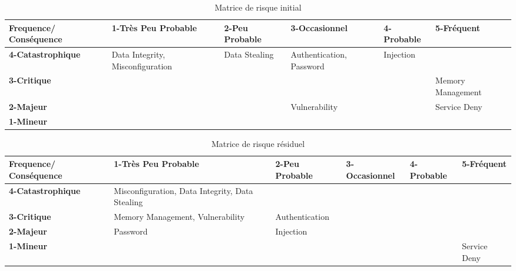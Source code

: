 \documentclass[12pt]{article}
\begin{document}

\begin{table}[H]
\centering
\scriptsize
\begin{tabular}{|p{2cm}|p{2cm}|p{2cm}| p{2cm} |p{2cm}| p{2cm}|}
\hline \bf Frequence/ Conséquence & \bf 1-Très Peu Probable & \bf 2-Peu Probable & \bf 3-Occasionnel & \bf 4-Probable & \bf 5-Fréquent\\ [10pt]
\hline \bf 4-Catastrophique &Data Integrity, Misconfiguration\cellcolor{yellow!50} & Data Stealing\cellcolor{red!50} & Authentication, Password\cellcolor{red!50} & Injection\cellcolor{red!50} &\cellcolor{red!50} \\ [10pt]
\hline \bf 3-Critique &\cellcolor{green!50} & \cellcolor{yellow!50} & \cellcolor{yellow!50} & \cellcolor{red!50} & Memory Management\cellcolor{red!50} \\ [10pt]
\hline \bf 2-Majeur & \cellcolor{green!50} & \cellcolor{green!50} & Vulnerability\cellcolor{yellow!50} &\cellcolor{yellow!50} &Service Deny\cellcolor{red!50} \\ [10pt]
\hline \bf 1-Mineur & \cellcolor{green!50} & \cellcolor{green!50} & \cellcolor{green!50} &\cellcolor{yellow!50} &\cellcolor{yellow!50} \\ [10pt]
\hline
\end{tabular}
\caption{Matrice de risque initial}

\end{table}

 

\begin{table}[H]
\centering
\scriptsize
\begin{tabular}{|p{2cm}|p{2cm}|p{2cm}| p{2cm} |p{2cm}| p{2cm}|}
\hline \bf Frequence/ Conséquence & \bf 1-Très Peu Probable & \bf 2-Peu Probable & \bf 3-Occasionnel & \bf 4-Probable & \bf 5-Fréquent\\ [10pt]
\hline \bf 4-Catastrophique & Misconfiguration, Data Integrity, Data Stealing \cellcolor{yellow!50} &\cellcolor{red!50} & \cellcolor{red!50} & \cellcolor{red!50} &\cellcolor{red!50} \\ [10pt]
\hline \bf 3-Critique &Memory Management, Vulnerability\cellcolor{green!50} & Authentication\cellcolor{yellow!50} & \cellcolor{yellow!50} & \cellcolor{red!50} &\cellcolor{red!50} \\ [10pt]
\hline \bf 2-Majeur & Password\cellcolor{green!50} & Injection\cellcolor{green!50} & \cellcolor{yellow!50} &\cellcolor{yellow!50} &\cellcolor{red!50} \\ [10pt]
\hline \bf 1-Mineur & \cellcolor{green!50} & \cellcolor{green!50} & \cellcolor{green!50} &\cellcolor{yellow!50} &Service Deny\cellcolor{yellow!50} \\ [10pt]
\hline
\end{tabular} 
\caption{Matrice de risque résiduel}
\end{table}
\end{document}
